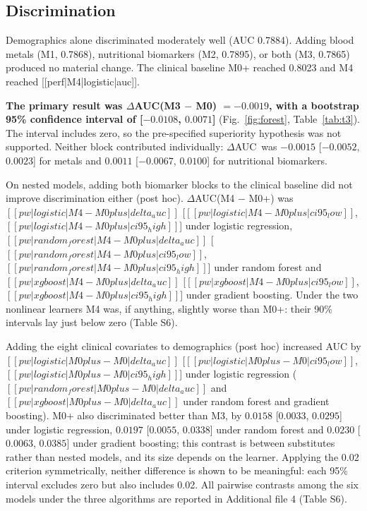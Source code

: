 \documentclass[12pt]{article}
\newcommand{\deltaauc}{$\Delta$AUC}
\begin{document}
\subsection*{Discrimination}

Demographics alone discriminated moderately well (AUC 0.7884). Adding blood metals (M1, 0.7868), nutritional biomarkers (M2, 0.7895), or both (M3, 0.7865) produced no material change. The clinical baseline M0+ reached 0.8023 and M4 reached [[perf|M4|logistic|auc]].

\textbf{The primary result was \deltaauc(M3 $-$ M0) $= -0.0019$, with a bootstrap 95\% confidence interval of [$-0.0108$, $0.0071$]} (Fig.~\ref{fig:forest}, Table~\ref{tab:t3}). The interval includes zero, so the pre-specified superiority hypothesis was not supported. Neither block contributed individually: \deltaauc\ was $-0.0015$ [$-0.0052$, $0.0023$] for metals and $0.0011$ [$-0.0067$, $0.0100$] for nutritional biomarkers.

On nested models, adding both biomarker blocks to the clinical baseline did not improve discrimination either (post hoc). \deltaauc(M4 $-$ M0+) was $[[pw|logistic|M4 - M0plus|delta_auc]]$ [$[[pw|logistic|M4 - M0plus|ci95_low]]$, $[[pw|logistic|M4 - M0plus|ci95_high]]$] under logistic regression, $[[pw|random_forest|M4 - M0plus|delta_auc]]$ [$[[pw|random_forest|M4 - M0plus|ci95_low]]$, $[[pw|random_forest|M4 - M0plus|ci95_high]]$] under random forest and $[[pw|xgboost|M4 - M0plus|delta_auc]]$ [$[[pw|xgboost|M4 - M0plus|ci95_low]]$, $[[pw|xgboost|M4 - M0plus|ci95_high]]$] under gradient boosting. Under the two nonlinear learners M4 was, if anything, slightly worse than M0+: their 90\% intervals lay just below zero (Table S6).

Adding the eight clinical covariates to demographics (post hoc) increased AUC by $[[pw|logistic|M0plus - M0|delta_auc]]$ [$[[pw|logistic|M0plus - M0|ci95_low]]$, $[[pw|logistic|M0plus - M0|ci95_high]]$] under logistic regression ($[[pw|random_forest|M0plus - M0|delta_auc]]$ and $[[pw|xgboost|M0plus - M0|delta_auc]]$ under random forest and gradient boosting). M0+ also discriminated better than M3, by $0.0158$ [$0.0033$, $0.0295$] under logistic regression, $0.0197$ [$0.0055$, $0.0338$] under random forest and $0.0230$ [$0.0063$, $0.0385$] under gradient boosting; this contrast is between substitutes rather than nested models, and its size depends on the learner. Applying the 0.02 criterion symmetrically, neither difference is shown to be meaningful: each 95\% interval excludes zero but also includes 0.02. All pairwise contrasts among the six models under the three algorithms are reported in Additional file 4 (Table S6).
\end{document}
